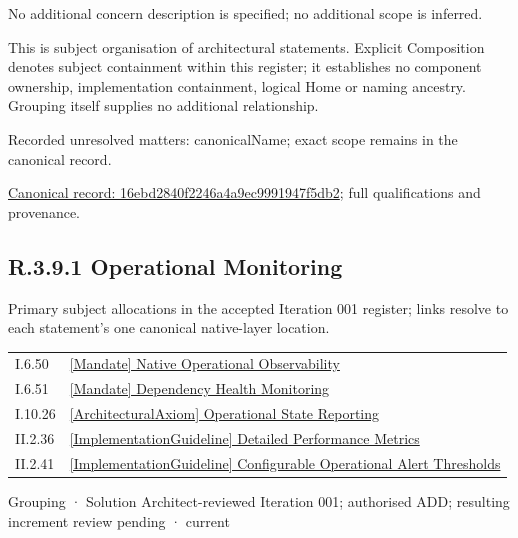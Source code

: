 No additional concern description is specified; no additional scope is inferred.



This is subject organisation of architectural statements. Explicit Composition denotes subject containment within this register; it establishes no component ownership, implementation containment, logical Home or naming ancestry. Grouping itself supplies no additional relationship.


{\small Recorded unresolved matters: canonicalName; exact scope remains in the canonical record.}\par
{\footnotesize \href{../../../../continuum/grouping/16ebd2840f2246a4a9ec9991947f5db2.md}{Canonical record: 16ebd2840f2246a4a9ec9991947f5db2}; full qualifications and provenance.}\par
\subsection*{R.3.9.1 Operational Monitoring}
\label{navigation:R.3.9.1}

Primary subject allocations in the accepted Iteration 001 register; links resolve to each statement’s one canonical native-layer location.\par
\begin{longtable}{p{.22\linewidth}p{.73\linewidth}}
I.6.50 & \hyperref[element:151906f8acad4519b7f9204cce9fc758]{[Mandate] Native Operational Observability} \\
I.6.51 & \hyperref[element:c5c8a76fbcbb466bb94f27b4863fb84c]{[Mandate] Dependency Health Monitoring} \\
I.10.26 & \hyperref[element:d7e3f0388d0043259585d1e4c5c948d6]{[ArchitecturalAxiom] Operational State Reporting} \\
II.2.36 & \hyperref[element:247ae4b498944e5f80c638fc958a3f43]{[ImplementationGuideline] Detailed Performance Metrics} \\
II.2.41 & \hyperref[element:587db702f9134c5b8292f894dbcba53d]{[ImplementationGuideline] Configurable Operational Alert Thresholds} \\
\end{longtable}
\label{element:cc0a0cc2678c4c7db20ad015a75cc1de}
{\small Grouping · Solution Architect-reviewed Iteration 001; authorised ADD; resulting increment review pending · current}\par

